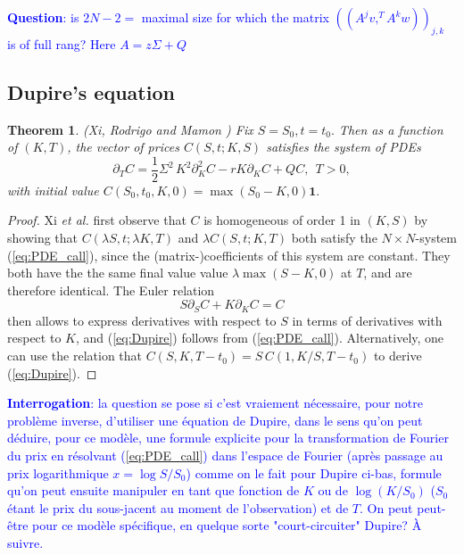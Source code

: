 \documentclass[a4paper, 11pt]{amsart}
\newtheorem{theorem}{Theorem}[section]
\newtheorem{definition and theorem}[theorem]{Definition and   
Theorem}
\begin{document}
\textcolor{blue}{{\bf Question}: is $2N - 2 = $ maximal size for which the matrix $\left( (A^j v , ^T A^k w ) \right) _{j, k } $ is of full rang? Here $A = z \Sigma + Q $ }

\subsection{Dupire's equation}

\begin{theorem} (Xi, Rodrigo and Mamon \cite{XRM}) Fix $S = S_0 , t = t_0 . $ Then as a function of $(K, T ) $, the vector of prices $C(S , t ; K, S ) $ satisfies the system of PDEs
    \begin{equation} \label{eq:Dupire}
        \partial _T C = \frac{1 }{2 } \Sigma ^2 \, K^2 \partial _K ^2 C - r K \partial _K C + Q C , \ \ T > 0 ,
    \end{equation}
    with initial value $C (S_0 , t_0 , K , 0 ) = \max (S_0 - K , 0 ) \mathbf{1 } . $
\end{theorem}

\begin{proof} Xi {\it et al.} \cite{XRM} first observe that $C $ is homogeneous of order 1 in $(K, S ) $ by showing that $C (\lambda S , t ; \lambda K , T ) $ and $\lambda C (S , t ; K , T ) $ both satisfy the $N \times N $-system (\ref{eq:PDE_call}), %
    since the (matrix-)coefficients of this system are constant. They both have the the same final value value $\lambda \max (S - K , 0 ) $ at $T $, and are therefore identical. The Euler relation
    $$
        S \partial _S C + K \partial _K C = C
    $$
    then allows to express derivatives with respect to $S $ in terms of derivatives with respect to $K $, and (\ref{eq:Dupire}) follows from (\ref{eq:PDE_call}). Alternatively, one can use the relation
    that $C (S, K , T - t_0 ) = S \, C (1 , K/S , T - t_0 ) $ to derive (\ref{eq:Dupire}).
\end{proof}

\noindent \textcolor{blue}{{\bf Interrogation}: la question se pose si c'est vraiement n\'ecessaire, pour notre probl\`eme inverse, d'utiliser une \'equation de Dupire, dans le sens qu'on peut d\'eduire, pour ce mod\`ele, une formule explicite pour la  transformation de Fourier du prix en r\'esolvant (\ref{eq:PDE_call}) dans l'espace de Fourier (apr\`es passage au prix logarithmique $x = \log S/S_0 $) comme on le fait pour Dupire ci-bas, formule qu'on peut ensuite manipuler en tant que fonction de $K $ ou de $\log (K/S_0 ) $ ($S_0 $ \'etant le prix du sous-jacent au moment de l'observation) et de $T . $ On peut peut-\^etre pour ce mod\`ele sp\'ecifique, en quelque sorte "court-circuiter" Dupire? \`A suivre.
}
\medskip
\end{document}
